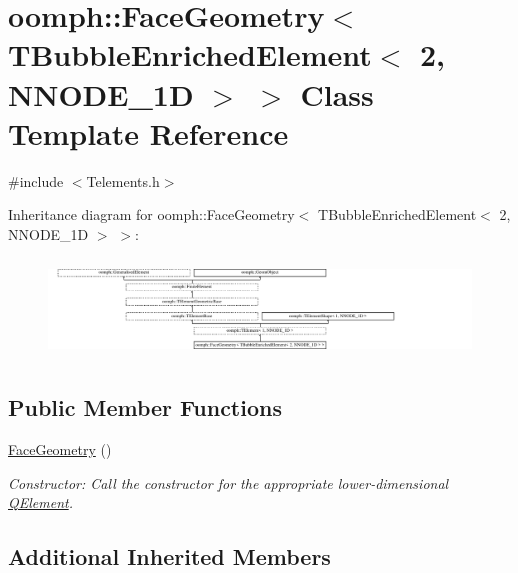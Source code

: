 \hypertarget{classoomph_1_1FaceGeometry_3_01TBubbleEnrichedElement_3_012_00_01NNODE__1D_01_4_01_4}{}\section{oomph\+:\+:Face\+Geometry$<$ T\+Bubble\+Enriched\+Element$<$ 2, N\+N\+O\+D\+E\+\_\+1D $>$ $>$ Class Template Reference}
\label{classoomph_1_1FaceGeometry_3_01TBubbleEnrichedElement_3_012_00_01NNODE__1D_01_4_01_4}


{\ttfamily \#include $<$Telements.\+h$>$}

Inheritance diagram for oomph\+:\+:Face\+Geometry$<$ T\+Bubble\+Enriched\+Element$<$ 2, N\+N\+O\+D\+E\+\_\+1D $>$ $>$\+:\begin{figure}[H]
\begin{center}
\leavevmode
\includegraphics[height=2.673031cm]{classoomph_1_1FaceGeometry_3_01TBubbleEnrichedElement_3_012_00_01NNODE__1D_01_4_01_4}
\end{center}
\end{figure}
\subsection*{Public Member Functions}
\begin{DoxyCompactItemize}
\item 
\hyperlink{classoomph_1_1FaceGeometry_3_01TBubbleEnrichedElement_3_012_00_01NNODE__1D_01_4_01_4_af28701fb4dd89fe45fe43f9ad0329606}{Face\+Geometry} ()
\begin{DoxyCompactList}\small\item\em Constructor\+: Call the constructor for the appropriate lower-\/dimensional \hyperlink{classoomph_1_1QElement}{Q\+Element}. \end{DoxyCompactList}\end{DoxyCompactItemize}
\subsection*{Additional Inherited Members}



